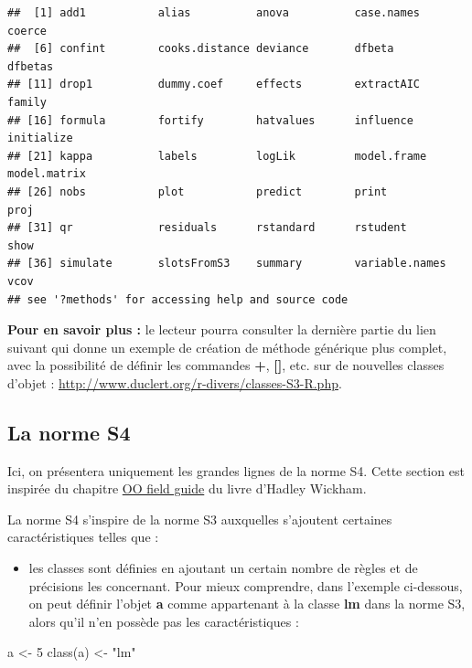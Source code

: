 \documentclass[
]{book}
\newenvironment{Shaded}{\begin{snugshade}}{\end{snugshade}}
\newcommand{\DecValTok}[1]{\textcolor[rgb]{0.00,0.00,0.81}{#1}}
\newcommand{\FunctionTok}[1]{\textcolor[rgb]{0.00,0.00,0.00}{#1}}
\newcommand{\NormalTok}[1]{#1}
\newcommand{\OtherTok}[1]{\textcolor[rgb]{0.56,0.35,0.01}{#1}}
\newcommand{\StringTok}[1]{\textcolor[rgb]{0.31,0.60,0.02}{#1}}
\providecommand{\tightlist}{%
  \setlength{\itemsep}{0pt}\setlength{\parskip}{0pt}}
\theoremstyle{definition}
\theoremstyle{definition}
\theoremstyle{definition}
\theoremstyle{definition}
\theoremstyle{remark}
\begin{document}
\begin{verbatim}
##  [1] add1           alias          anova          case.names     coerce        
##  [6] confint        cooks.distance deviance       dfbeta         dfbetas       
## [11] drop1          dummy.coef     effects        extractAIC     family        
## [16] formula        fortify        hatvalues      influence      initialize    
## [21] kappa          labels         logLik         model.frame    model.matrix  
## [26] nobs           plot           predict        print          proj          
## [31] qr             residuals      rstandard      rstudent       show          
## [36] simulate       slotsFromS3    summary        variable.names vcov          
## see '?methods' for accessing help and source code
\end{verbatim}

\textbf{Pour en savoir plus :} le lecteur pourra consulter la dernière partie du lien suivant qui donne un exemple de création de méthode générique plus complet, avec la possibilité de définir les commandes \textbf{+}, \textbf{{[}{]}}, etc. sur de nouvelles classes d'objet : \url{http://www.duclert.org/r-divers/classes-S3-R.php}.

\hypertarget{la-norme-s4}{%
\subsection{La norme S4}\label{la-norme-s4}}

Ici, on présentera uniquement les grandes lignes de la norme S4. Cette section est inspirée du chapitre \href{http://adv-r.had.co.nz/OO-essentials.html}{OO field guide} du livre d'Hadley Wickham.

La norme S4 s'inspire de la norme S3 auxquelles s'ajoutent certaines caractéristiques telles que :

\begin{itemize}
\tightlist
\item
  les classes sont définies en ajoutant un certain nombre de règles et de précisions les concernant. Pour mieux comprendre, dans l'exemple ci-dessous, on peut définir l'objet \textbf{a} comme appartenant à la classe \textbf{lm} dans la norme S3, alors qu'il n'en possède pas les caractéristiques :
\end{itemize}

\begin{Shaded}
\begin{Highlighting}[]
\NormalTok{a }\OtherTok{\textless{}{-}} \DecValTok{5}
\FunctionTok{class}\NormalTok{(a) }\OtherTok{\textless{}{-}} \StringTok{"lm"}
\end{Highlighting}
\end{Shaded}
\end{document}
